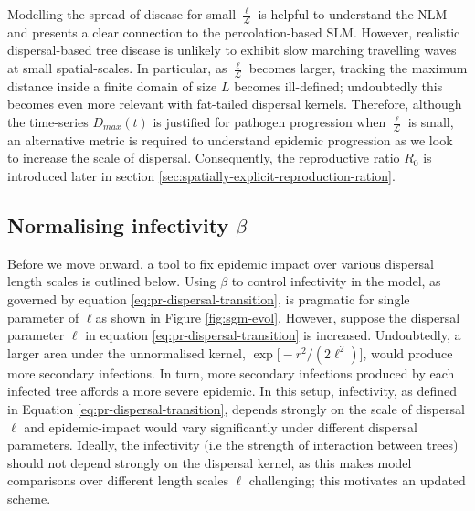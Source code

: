 Modelling the spread of disease for small $\frac{\ell}{\mathcal{L}}$ is helpful to understand the NLM and presents a clear connection to the percolation-based SLM.
However, realistic dispersal-based tree disease is unlikely to exhibit slow marching travelling waves at small spatial-scales.
In particular, as $\frac{\ell}{\mathcal{L}}$ becomes larger, tracking the maximum distance inside a finite domain of size $L$ becomes ill-defined; undoubtedly this becomes even more relevant with fat-tailed dispersal kernels.
Therefore, although the time-series $D_{max}(t)$ is justified for pathogen progression when $\frac{\ell}{\mathcal{L}}$ is small, an alternative metric is required to understand epidemic progression as we look to increase the scale of dispersal.
Consequently, the reproductive ratio $R_0$ is introduced later in section \ref{sec:spatially-explicit-reproduction-ration}.

\newpage 

\subsection{Normalising infectivity $\beta$}

Before we move onward, a tool to fix epidemic impact over various dispersal length scales is outlined below.
Using $\beta$ to control infectivity in the model, as governed by equation \ref{eq:pr-dispersal-transition}, is pragmatic for single parameter of $\ell$\textemdash as shown in Figure \ref{fig:sgm-evol}.
However, suppose the dispersal parameter $\ell$ in equation \ref{eq:pr-dispersal-transition} is increased. 
Undoubtedly, a larger area under the unnormalised kernel, $\exp\big[-r^2/(2\ell^2)\big]$, would produce more secondary infections.
In turn, more secondary infections produced by each infected tree affords a more severe epidemic.
In this setup, infectivity, as defined in Equation \ref{eq:pr-dispersal-transition}, depends strongly on the scale of dispersal $\ell$ and epidemic-impact would vary significantly under different dispersal parameters.
Ideally, the infectivity (i.e the strength of interaction between trees) should not depend strongly on the dispersal kernel, as this makes model comparisons over different length scales $\ell$ challenging;
this motivates an updated scheme.

